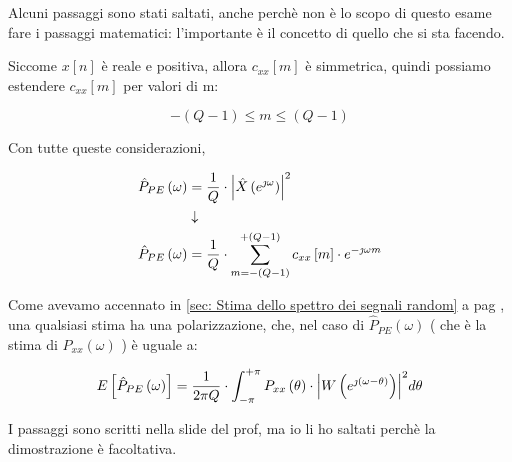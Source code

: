 \begin{tcolorbox}
    Alcuni passaggi sono stati saltati, anche perchè non è lo scopo di questo esame fare i passaggi matematici: l'importante è il concetto di quello che si sta facendo. 
\end{tcolorbox}

Siccome $x \left[ n\right]$ è reale e positiva, allora $c_{xx} \left[ m\right]$ è simmetrica, quindi possiamo estendere $c_{xx} \left[ m\right]$ per valori di m: 

{
    \Large 
    \begin{equation}
        - \left(Q - 1\right)
        \leq 
        m 
        \leq 
        \left(Q - 1\right)
    \end{equation}
}

\newpage 

Con tutte queste considerazioni, 

{
    \Large 
    \begin{equation}
        \begin{split}
        \hat{P}_{PE} \left(\omega\right)
        &= 
        \dfrac{1}{Q} \cdot \abs{\hat{X} \left(e^{\jmath \omega}\right)}^{2}
        \\
        &\downarrow
        \\
        \hat{P}_{PE} \left(\omega\right)
        &= 
        \dfrac{1}{Q} 
        \cdot 
        \sum_{m = - \left(Q - 1\right)}^{+ \left(Q - 1\right)}
        c_{xx} \left[ m\right]
        \cdot 
        e^{- \jmath \omega m}
        \end{split}
    \end{equation}
}

Come avevamo accennato in \ref{sec: Stima dello spettro dei segnali random}  a pag \pageref{sec: Stima dello spettro dei segnali random}, 
una qualsiasi stima ha una polarizzazione, che, nel caso di $\hat{P}_{PE} \left(\omega\right)$ ( che è la stima di $P_{xx} \left(\omega\right)$ )  è uguale a: 

{
    \Large 
    \begin{equation}
        E \left[ \hat{P}_{PE} \left(\omega\right)\right]
        = 
        \dfrac{1}{2 \pi Q}
        \cdot 
        \int_{- \pi}^{+ \pi}
        P_{xx} \left(\theta\right)
        \cdot 
        \abs{W \left(e^{\jmath \left(\omega - \theta\right)}\right)}^{2}
        d \theta
    \end{equation}
}

\begin{tcolorbox}
    I passaggi sono scritti nella slide del prof, ma io li ho saltati perchè la dimostrazione è facoltativa. 
\end{tcolorbox} 


